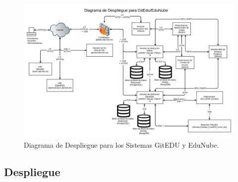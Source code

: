 \begin{landscape}
	\begin{figure}
	  \begin{center}
	    \includegraphics[width=1.4\textwidth]{Figures/desp_ge_en.png}
	  \end{center}
	  \caption{Diagrama de Despliegue para los Sistemas GitEDU y EduNube.}
	  \label{desp_ge_en}
	\end{figure}
\end{landscape}

\subsection{Despliegue}

